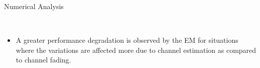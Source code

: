 \documentclass[12pt]{beamer}
\newcommand{\fs}[2]{\fontsize{#1 pt}{#2}\selectfont}
\begin{document}
\begin{frame}[t]{Numerical Analysis}
        \begin{overlayarea}{\textwidth}{6.0cm}
        \begin{center}
                \fs{8}{8}
                 \\
        \end{center}
        \end{overlayarea}
        \fs{8}{8}
        \begin{itemize}
                \item A greater performance degradation is observed by the EM for situations where the variations are affected more due to channel estimation as compared to channel fading. 
        \end{itemize}
\end{frame}
\end{document}

